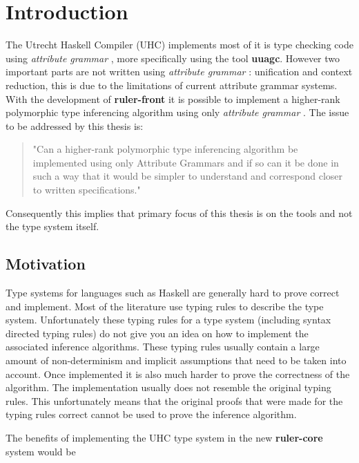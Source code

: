 \documentclass[twoside, titlepage, openright, a4paper]{book}
\newcommand{\ag}{\emph{attribute grammar }}
\begin{document}





\newpage
\thispagestyle{headings}
\mbox{}

\tableofcontents

\chapter{Introduction}
The Utrecht Haskell Compiler (UHC\cite{UHC}) implements most of it is type checking code using \ag, more specifically using the tool \textbf{uuagc}\cite{uuagc}. However two important parts are not written using \ag: unification and context reduction, this is due to the limitations of current attribute grammar systems. With the development of \textbf{ruler-front}\cite{ruler-front} it is possible to implement a higher-rank polymorphic type inferencing algorithm using only \ag. The issue to be addressed by this thesis is:

\begin{quotation}
"Can a higher-rank polymorphic type inferencing algorithm be implemented using only Attribute Grammars and if so can it be done in such a way that it would be simpler to understand and correspond closer to written specifications."
\end{quotation}

Consequently this implies that primary focus of this thesis is on the tools and not the type system itself.

\section{Motivation}
Type systems for languages such as Haskell are generally hard to prove correct and implement. Most of the literature use typing rules to describe the type system. Unfortunately these typing rules for a type system (including syntax directed typing rules) do not give you an idea on how to implement the associated inference algorithms. These typing rules usually contain a large amount of non-determinism and implicit assumptions that need to be taken into account.
Once implemented it is also much harder to prove the correctness of the algorithm. The implementation usually does not resemble the original typing rules. This unfortunately means that the original proofs that were made for the typing rules correct cannot be used to prove the inference algorithm.

The benefits of implementing the UHC type system in the new \textbf{ruler-core} system would be
\end{document}
